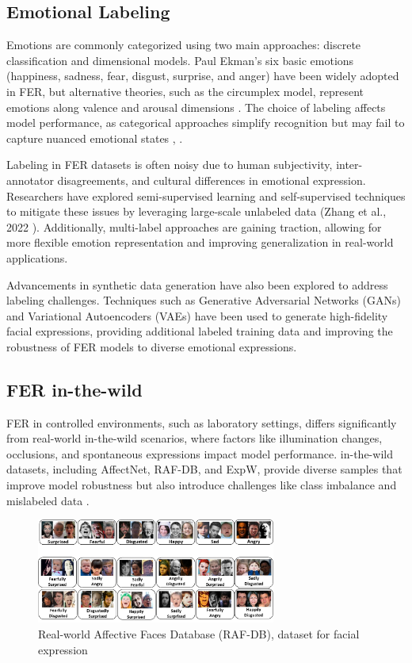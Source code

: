 \subsection{Emotional Labeling}

Emotions are commonly categorized using two main approaches: discrete classification and dimensional models. Paul Ekman’s six basic emotions (happiness, sadness, fear, disgust, surprise, and anger) have been widely adopted in FER, but alternative theories, such as the circumplex model, represent emotions along valence and arousal dimensions \cite{russell_circumplex_1980}. The choice of labeling affects model performance, as categorical approaches simplify recognition but may fail to capture nuanced emotional states \cite{mollahosseini_affectnet_2019}, \cite{kollias_affect_2021}. 

Labeling in FER datasets is often noisy due to human subjectivity, inter-annotator disagreements, and cultural differences in emotional expression. Researchers have explored semi-supervised learning and self-supervised techniques to mitigate these issues by leveraging large-scale unlabeled data (Zhang et al., 2022 \cite{zhang_transformer-based_2022}). Additionally, multi-label approaches are gaining traction, allowing for more flexible emotion representation and improving generalization in real-world applications. 

Advancements in synthetic data generation have also been explored to address labeling challenges. Techniques such as Generative Adversarial Networks (GANs) and Variational Autoencoders (VAEs) have been used to generate high-fidelity facial expressions, providing additional labeled training data and improving the robustness of FER models to diverse emotional expressions. 

\subsection{FER in-the-wild}

FER in controlled environments, such as laboratory settings, differs significantly from real-world \gls{in-the-wild} scenarios, where factors like illumination changes, occlusions, and spontaneous expressions impact model performance. \gls{in-the-wild} datasets, including AffectNet, RAF-DB, and ExpW, provide diverse samples that improve model robustness but also introduce challenges like class imbalance and mislabeled data \cite{zhang_leave_2023}. 


\begin{figure}[H]
\centering
   \includegraphics[width=0.70\textwidth]{../images/faces_rafdb_dataset.png}
\caption{Real-world Affective Faces Database (RAF-DB), dataset for facial expression}
\label{fig:RAF-DB}
\end{figure}

